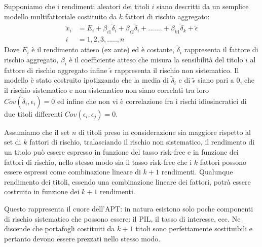 Supponiamo che i rendimenti aleatori dei titoli $i$ siano descritti da un semplice modello multifattoriale costituito da $k$ fattori di rischio aggregato: 
\begin{equation}
\begin{split}
\label{Rendimentoapt2}
\tilde{x}_i & = E_i +\beta_{i1}\tilde{\delta}_i+\beta_{i2}\tilde{\delta}_i+ .......+ \beta_{k1}\tilde{\delta}_k +\tilde{\epsilon} \\
i& = 1,2,3,.....,n
\end{split}
\end{equation}
Dove $E_i$ è il rendimento atteso (ex ante) ed è costante, $\tilde{\delta}_i$ rappresenta il fattore di rischio aggregato, $\beta_i$ è il coefficiente atteso che misura la sensibilità del titolo $i$ al fattore di rischio aggregato infine $\tilde{\epsilon}$ rappresenta il rischio non sistematico. Il modello è stato costruito ipotizzando che la media di $\tilde{\delta}_i$ e di $\tilde{\epsilon}$ siano pari a 0, che il rischio sistematico e non sistematico non siano correlati tra loro $Cov(\tilde{\delta}_i,\epsilon_i)=0$ ed infine che non vi è correlazione fra i rischi idiosincratici di due titoli differenti $Cov(\epsilon_i,\epsilon_j)=0$. 

Assumiamo che il set $n$ di titoli preso in considerazione sia maggiore rispetto al set di $k$ fattori di rischio, tralasciando il rischio non sistematico, il rendimento di un titolo può essere espresso in funzione del tasso risk-free e in funzione dei fattori di rischio, nello stesso modo sia il tasso risk-free che i $k$ fattori possono essere espressi come combinazione lineare di $k+1$ rendimenti. Qualunque rendimento dei titoli, essendo una combinazione lineare dei fattori, potrà essere costruito in funzione dei  $k+1$ rendimenti.

Questo rappresenta il cuore dell'APT: in natura esistono solo poche componenti di rischio sistematico che possono essere: il PIL, il tasso di interesse, ecc.
Ne discende che portafogli costituiti da  $k+1$ titoli sono perfettamente sostituibili e pertanto devono essere prezzati nello stesso modo.

